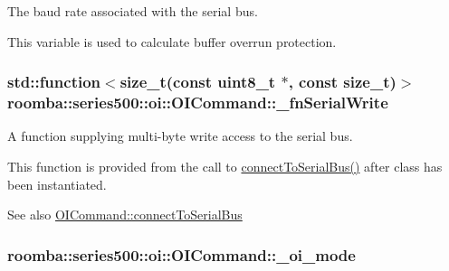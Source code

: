 The baud rate associated with the serial bus. 

This variable is used to calculate buffer overrun protection. \hypertarget{classroomba_1_1series500_1_1oi_1_1_o_i_command_aaf58f3199a9cf846e1a0e4858add8e77}{
\subsubsection[{\+\_\+fn\+Serial\+Write}]{\setlength{\rightskip}{0pt plus 5cm}std\+::function$<$size\+\_\+t(const uint8\+\_\+t $\ast$, const size\+\_\+t)$>$ roomba\+::series500\+::oi\+::\+O\+I\+Command\+::\+\_\+fn\+Serial\+Write\hspace{0.3cm}{\ttfamily [protected]}}}\label{classroomba_1_1series500_1_1oi_1_1_o_i_command_aaf58f3199a9cf846e1a0e4858add8e77}


A function supplying multi-\/byte write access to the serial bus. 

This function is provided from the call to \hyperlink{classroomba_1_1series500_1_1oi_1_1_o_i_command_ae2fe639f2810b3313d458569a06e0202}{connect\+To\+Serial\+Bus()} after class has been instantiated. \begin{DoxySeeAlso}{See also}
\hyperlink{classroomba_1_1series500_1_1oi_1_1_o_i_command_ae2fe639f2810b3313d458569a06e0202}{O\+I\+Command\+::connect\+To\+Serial\+Bus} 
\end{DoxySeeAlso}
\hypertarget{classroomba_1_1series500_1_1oi_1_1_o_i_command_af68de62dce7922f17562c53b79c90488}{
\subsubsection[{\+\_\+oi\+\_\+mode}]{ roomba\+::series500\+::oi\+::\+O\+I\+Command\+::\+\_\+oi\+\_\+mode\hspace{0.3cm}{\ttfamily [protected]}}}\label{classroomba_1_1series500_1_1oi_1_1_o_i_command_af68de62dce7922f17562c53b79c90488}


